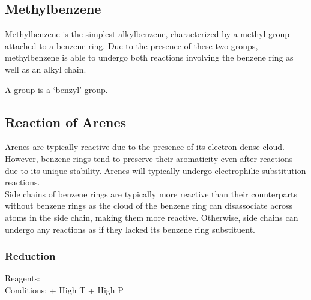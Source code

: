 \documentclass[../main]{subfiles}
\begin{document}
	\begin{center}
	\end{center}

	\subsection{Methylbenzene}

	Methylbenzene is the simplest alkylbenzene, characterized by a methyl group attached to a benzene ring. Due to the presence of these two groups, methylbenzene is able to undergo both reactions involving the benzene ring as well as an alkyl chain. \\

	\begin{center}
	\end{center}

	A  group is a `benzyl' group. \\

	\begin{center}
	\end{center}

	\subsection{Reaction of Arenes}

	Arenes are typically reactive due to the presence of its electron-dense  cloud. However, benzene rings tend to preserve their aromaticity even after reactions due to its unique stability. Arenes will typically undergo electrophilic substitution reactions. \\

	Side chains of benzene rings are typically more reactive than their counterparts without benzene rings as the  cloud of the benzene ring can disassociate across  atoms in the side chain, making them more reactive. Otherwise, side chains can undergo any reactions as if they lacked its benzene ring substituent.

	\subsubsection{Reduction}

	Reagents: \\
	Conditions:  + High T + High P 
\end{document}
